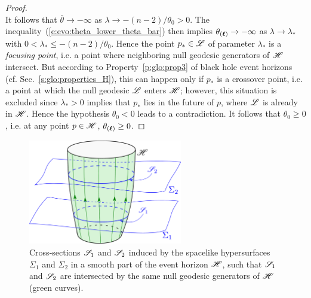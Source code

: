 \begin{proof}
\[\]
It follows that $\bar\theta \to -\infty$ as $\lambda \to -(n-2)/\theta_0 > 0$.
The inequality~(\ref{e:evo:theta_lower_theta_bar}) then implies
$\theta_{(\bm{\ell})} \to -\infty$ as $\lambda \to \lambda_*$
with $0 < \lambda_* \leq -(n-2)/\theta_0$. Hence the point $p_*\in\mathscr{L}$ of parameter $\lambda_*$ is a \emph{focusing point},
i.e. a point where neighboring null geodesic generators of $\mathscr{H}$ intersect.
But according to Property~\ref{p:glo:prop3} of black hole event horizons (cf. Sec.~\ref{s:glo:properties_H}), this can happen
only if $p_*$ is a crossover point, i.e.
a point at which the null geodesic $\mathscr{L}$ enters $\mathscr{H}$; however,
this situation is excluded since $\lambda_* > 0$ implies that $p_*$ lies in the
future of $p$, where $\mathscr{L}$ is already in $\mathscr{H}$. Hence the hypothesis
$\theta_0 < 0$ leads to a contradiction. It follows that $\theta_0 \geq 0$,
i.e. at any point $p\in\mathscr{H}$,  $\theta_{(\bm{\ell})} \geq 0$.
\end{proof}

\begin{figure}
\centerline{\includegraphics[width=0.6\textwidth]{evo_area_thm_smooth.pdf}}
\caption[]{\label{f:evo:area_thm_smooth} \footnotesize
Cross-sections $\mathscr{S}_1$ and $\mathscr{S}_2$ induced by the spacelike hypersurfaces $\Sigma_1$
and $\Sigma_2$ in a smooth part of the event horizon $\mathscr{H}$,
such that $\mathscr{S}_1$ and $\mathscr{S}_2$ are intersected by the same null geodesic
generators of $\mathscr{H}$ (green curves).}
\end{figure}



